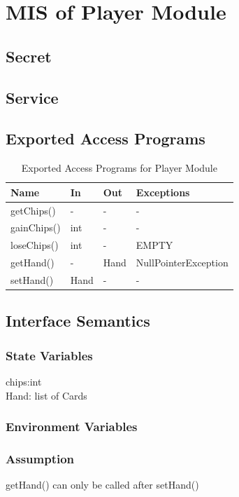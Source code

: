 \documentclass[11pt]{article}
\begin{document}
 	\section{MIS of Player Module}
     \subsection{Secret}
    \subsection{Service}
    \subsection{Exported Access Programs}
    \begin{table}[h]
    \caption{Exported Access Programs for Player Module}
    \begin{tabular}{p{4cm}p{2cm}p{2cm}p{4cm}}
    Name & In & Out & Exceptions\\
    \hline
    getChips() & - & - & -\\
    \hline
    gainChips() & int & - & -\\
	\hline    
    loseChips() & int & - & EMPTY\\
	\hline    	
    getHand() & - & Hand & NullPointerException \\
	\hline    
    setHand()& Hand & - & -\\
    \hline
    \end{tabular}
    \end{table}
    \subsection{Interface Semantics}
    \subsubsection{State Variables}
    chips:int\\
    Hand: list of Cards
    \subsubsection{Environment Variables}
    \subsubsection{Assumption}
    getHand() can only be called after setHand()
\end{document}
